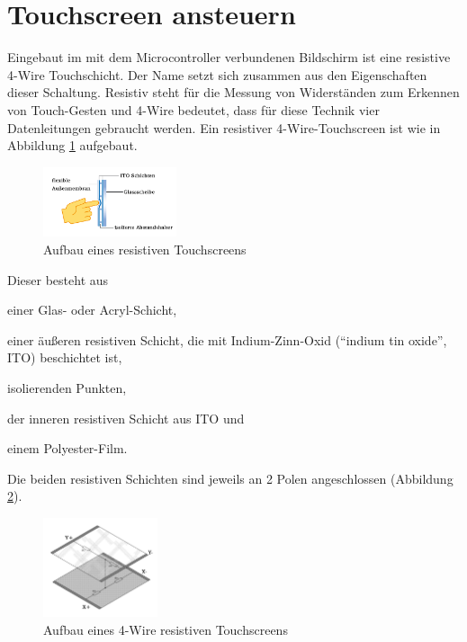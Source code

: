 \section{\ExercisePrefixEmbeddedC Touchscreen ansteuern \optional}
Eingebaut im mit dem Microcontroller verbundenen Bildschirm ist eine resistive 4-Wire Touchschicht.
Der Name setzt sich zusammen aus den Eigenschaften dieser Schaltung.
Resistiv steht für die Messung von Widerständen zum Erkennen von Touch-Gesten und 4-Wire bedeutet, dass für diese Technik vier Datenleitungen gebraucht werden.
Ein resistiver 4-Wire-Touchscreen ist wie in Abbildung \ref{fig:rsTouch} aufgebaut.

\begin{figure}[!htb]
    \centering
    \includegraphics[width=0.35\textwidth]{./05_c/figures/4WireRSTouch.png}
    \caption{Aufbau eines resistiven Touchscreens}
    \label{fig:rsTouch}
\end{figure}

Dieser besteht aus
\begin{inparaenum}
\item
einer Glas- oder Acryl-Schicht,
\item 
einer äußeren resistiven Schicht, die mit Indium-Zinn-Oxid (\enquote{indium tin oxide}, ITO) beschichtet ist,
\item 
isolierenden Punkten,
\item 
der inneren resistiven Schicht aus ITO und 
\item
einem Polyester-Film.
\end{inparaenum}
Die beiden resistiven Schichten sind jeweils an 2 Polen angeschlossen (Abbildung \ref{fig:fourRSTouch}).

\begin{figure}[!htb]
    \centering
    \includegraphics[width=0.3\textwidth]{./05_c/figures/ResistiveTS.png}
    \caption{Aufbau eines 4-Wire resistiven Touchscreens }
    \label{fig:fourRSTouch}
\end{figure} 

